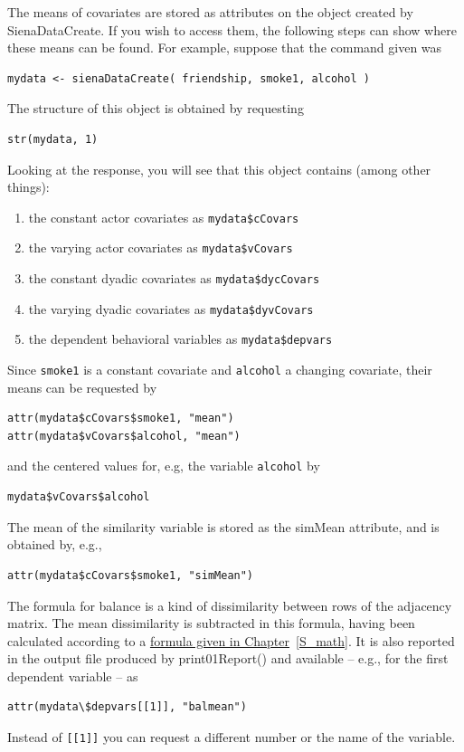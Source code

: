 \documentclass[a4paper,fleqn,11pt]{article}
\newcommand{\+}{\, + \,}
\newcommand{\sfn}[1]{\textsf{#1}}
\begin{document}
The means of covariates are stored as attributes on the object created by
\sfn{SienaDataCreate}.
If you wish to access them, the following steps can show
where these means can be found.
For example, suppose that the command given was
\begin{verbatim}
mydata <- sienaDataCreate( friendship, smoke1, alcohol )
\end{verbatim}
The structure of this object is obtained by requesting
\begin{verbatim}
str(mydata, 1)
\end{verbatim}
Looking at the response, you
will see that this object contains (among other things):
\begin{enumerate}
\item the constant actor covariates as \texttt{mydata\$cCovars}
\item the varying actor covariates as \texttt{mydata\$vCovars}
\item the constant dyadic covariates as \texttt{mydata\$dycCovars}
\item the varying dyadic covariates as \texttt{mydata\$dyvCovars}
\item the dependent behavioral variables as \texttt{mydata\$depvars}
\end{enumerate}
Since \texttt{smoke1} is a constant covariate and \texttt{alcohol}
a changing covariate, their means can be requested by
\begin{verbatim}
attr(mydata$cCovars$smoke1, "mean")
attr(mydata$vCovars$alcohol, "mean")
\end{verbatim}
and the centered values for, e.g, the variable \texttt{alcohol} by
\begin{verbatim}
mydata$vCovars$alcohol
\end{verbatim}
The mean of the similarity variable is stored as the \sfn{simMean} attribute,
and is obtained by, e.g.,
\begin{verbatim}
attr(mydata$cCovars$smoke1, "simMean")
\end{verbatim}

The formula for balance is a kind of dissimilarity between rows of
the adjacency matrix. The mean dissimilarity is subtracted in this
formula, having been calculated according to a
\hyperlink{T_meanbal}{formula given in Chapter}~\ref{S_math}.
It is also reported in the
 output file produced by \sfn{print01Report()} and available -- e.g., for the first
dependent variable -- as
\begin{verbatim}
attr(mydata\$depvars[[1]], "balmean")
\end{verbatim}
Instead of \texttt{[[1]]} you can request a different number or
the name of the variable.
\smallskip
\end{document}
